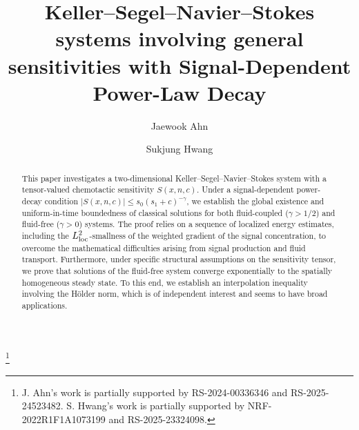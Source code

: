 \documentclass{amsart}
\numberwithin{equation}{section}
\begin{document}
\title[Keller--Segel--Navier--Stokes systems]{Keller--Segel--Navier--Stokes systems involving general sensitivities with Signal-Dependent Power-Law Decay}

\author[J. Ahn]{Jaewook Ahn}
\address{J. Ahn: Department of Mathematics, Dongguk University, Seoul 04620, Republic of Korea}

\author[S. Hwang]{Sukjung Hwang}
\address{S. Hwang: Department of Mathematics Education, Chungbuk National University, Cheongju 28644, Republic of Korea}





\thanks{J. Ahn's work  is partially supported by RS-2024-00336346 and RS-2025-24523482. S. Hwang's work is partially supported by NRF-2022R1F1A1073199 and RS-2025-23324098.}


\date{}


\makeatletter
{}
\makeatother
{}





\begin{abstract}
This paper investigates a two-dimensional Keller--Segel--Navier--Stokes system with a tensor-valued chemotactic sensitivity $S(x,n,c)$. Under a signal-dependent power-decay condition $|S(x,n,c)| \le s_0 (s_1+c)^{-\gamma}$, we establish the global existence and uniform-in-time boundedness of classical solutions for both fluid-coupled ($\gamma > 1/2$) and fluid-free ($\gamma > 0$) systems. The proof relies on a sequence of localized energy estimates, including the $L^{2}_{\rm loc}$-smallness of the weighted gradient of the signal concentration, to overcome the mathematical difficulties arising from signal production and fluid transport. Furthermore, under specific structural assumptions on the sensitivity tensor, we prove that solutions of the fluid-free system converge exponentially to the spatially homogeneous steady state. To this end, we establish an interpolation inequality involving the H\"older norm, which is of independent interest and seems to have broad applications.
\end{abstract}
\maketitle
\end{document}
